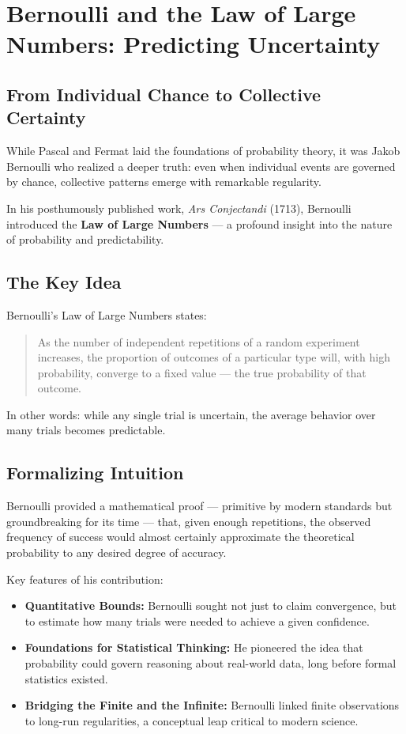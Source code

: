 \section{Bernoulli and the Law of Large Numbers: Predicting Uncertainty}

\subsection{From Individual Chance to Collective Certainty}

While Pascal and Fermat laid the foundations of probability theory, it was Jakob Bernoulli who realized a deeper truth: even when individual events are governed by chance, collective patterns emerge with remarkable regularity.

In his posthumously published work, \textit{Ars Conjectandi} (1713), Bernoulli introduced the \textbf{Law of Large Numbers} — a profound insight into the nature of probability and predictability.

\subsection{The Key Idea}

Bernoulli's Law of Large Numbers states:

\begin{quote}
    As the number of independent repetitions of a random experiment increases, the proportion of outcomes of a particular type will, with high probability, converge to a fixed value — the true probability of that outcome.
\end{quote}

In other words: while any single trial is uncertain, the average behavior over many trials becomes predictable.

\subsection{Formalizing Intuition}

Bernoulli provided a mathematical proof — primitive by modern standards but groundbreaking for its time — that, given enough repetitions, the observed frequency of success would almost certainly approximate the theoretical probability to any desired degree of accuracy.

Key features of his contribution:
\begin{itemize}
    \item \textbf{Quantitative Bounds:} Bernoulli sought not just to claim convergence, but to estimate how many trials were needed to achieve a given confidence.
    \item \textbf{Foundations for Statistical Thinking:} He pioneered the idea that probability could govern reasoning about real-world data, long before formal statistics existed.
    \item \textbf{Bridging the Finite and the Infinite:} Bernoulli linked finite observations to long-run regularities, a conceptual leap critical to modern science.
\end{itemize}

